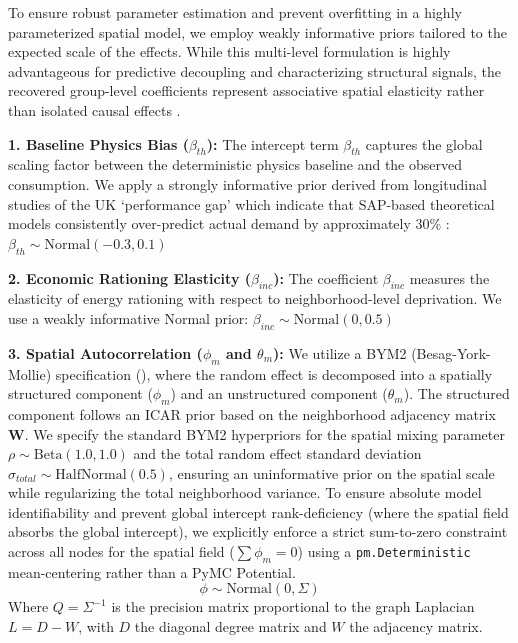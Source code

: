 \documentclass[11pt, a4paper, twocolumn, numbers]{elsarticle}
\begin{document}
To ensure robust parameter estimation and prevent overfitting in a
highly parameterized spatial model, we employ weakly informative priors
tailored to the expected scale of the effects. While this multi-level 
formulation is highly advantageous for predictive decoupling and characterizing 
structural signals, the recovered group-level coefficients represent 
associative spatial elasticity rather than isolated causal effects 
\cite{Gelman2006}.

\textbf{1. Baseline Physics Bias (\(\beta_{th}\)):} The intercept term
\(\beta_{th}\) captures the global scaling factor between the
deterministic physics baseline and the observed consumption. We apply a
strongly informative prior derived from longitudinal studies of the UK
`performance gap' which indicate that SAP-based theoretical models
consistently over-predict actual demand by approximately 30\% \cite{Tinsley2022, DECC2013}: 
$\beta_{th} \sim \text{Normal}(-0.3, 0.1)$

\textbf{2. Economic Rationing Elasticity (\(\beta_{inc}\)):}
 The
coefficient \(\beta_{inc}\) measures the elasticity of energy rationing
with respect to neighborhood-level deprivation. We use a weakly
informative Normal prior: $\beta_{inc} \sim \text{Normal}(0, 0.5)$

\textbf{3. Spatial Autocorrelation (\(\phi_m\) and \(\theta_m\)):} We utilize a BYM2 (Besag-York-Mollie) specification (\cite{Riebler2016}), where the random effect is decomposed into a spatially structured component (\(\phi_m\)) and an unstructured component (\(\theta_m\)). The structured component follows an ICAR prior based on the neighborhood adjacency matrix \(\bm{W}\). We specify the standard BYM2 hyperpriors for the spatial mixing parameter $\rho \sim \text{Beta}(1.0, 1.0)$ and the total random effect standard deviation $\sigma_{total} \sim \text{HalfNormal}(0.5)$, ensuring an uninformative prior on the spatial scale while regularizing the total neighborhood variance. To ensure absolute model identifiability and prevent global intercept rank-deficiency (where the spatial field absorbs the global intercept), we explicitly enforce a strict sum-to-zero constraint across all nodes for the spatial field ($\sum \phi_m = 0$) using a \texttt{pm.Deterministic} mean-centering rather than a PyMC Potential.
\begin{equation} \phi \sim \text{Normal}(0, \Sigma) \end{equation}
Where $Q = \Sigma^{-1}$ is the precision matrix proportional to the graph Laplacian $L = D - W$, with $D$ the diagonal degree matrix and $W$ the adjacency matrix.
\end{document}
